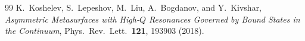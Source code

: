 \documentclass[11pt,a4paper]{article}
\begin{document}
\begin{thebibliography}{99}
K.~Koshelev, S.~Lepeshov, M.~Liu, A.~Bogdanov, and Y.~Kivshar,
\emph{Asymmetric Metasurfaces with High-$Q$ Resonances Governed by Bound
States in the Continuum},
Phys.\ Rev.\ Lett.\ \textbf{121}, 193903 (2018).
\end{thebibliography}
\end{document}
